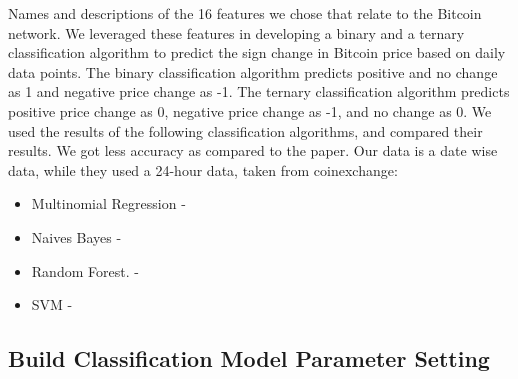\documentclass{article}
\begin{document}
Names and descriptions of the 16 features we chose that relate to the Bitcoin network. We leveraged these features in developing a binary and a ternary classification algorithm to predict the sign change in Bitcoin price based on daily data points. The binary classification algorithm predicts positive and no change as 1 and negative price change as -1. The ternary classification algorithm predicts positive price change as 0, negative price change as -1, and no change as 0. We used the results of the following classification algorithms, and compared their results. We got less accuracy as compared to the paper. Our data is a date wise data, while they used a 24-hour data, taken from coinexchange:
\begin{itemize}
\item Multinomial Regression  -
\item Naives Bayes		      -
\item Random Forest.             -
\item SVM 		              -
 \end{itemize}

\subsection {Build Classification Model Parameter Setting}
\end{document}
